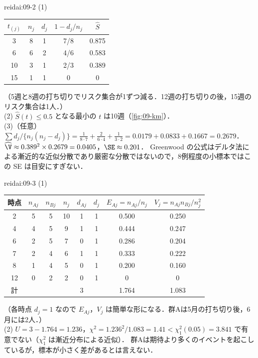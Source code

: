 \begin{kaitou}{reidai:09-2}
(1)
\begin{center}\small
\begin{tabular}{@{}ccccc@{}}
\toprule
$t_{(j)}$ & $n_j$ & $d_j$ & $1-d_j/n_j$ & $\hat S$\\
\midrule
3 & 8 & 1 & 7/8 & 0.875\\
6 & 6 & 2 & 4/6 & 0.583\\
10 & 3 & 1 & 2/3 & 0.389\\
15 & 1 & 1 & 0 & 0\\
\bottomrule
\end{tabular}
\end{center}
（5週と8週の打ち切りでリスク集合が1ずつ減る．12週の打ち切りの後，15週のリスク集合は1人．）\\
(2) $\hat S(t)\le0.5$ となる最小の $t$ は10週（\cref{fig:09-km}）．\\
(3)（任意）$\sum d_j/\{n_j(n_j-d_j)\}=\frac{1}{8\cdot7}+\frac{2}{6\cdot4}+\frac{1}{3\cdot2}=0.0179+0.0833+0.1667=0.2679$．
$\widehat\V\approx0.389^2\times0.2679=0.0405$，$\SE\approx0.201$．
Greenwood の公式はデルタ法による漸近的な近似分散であり厳密な分散ではないので，8例程度の小標本ではこの SE は目安にすぎない．
\end{kaitou}

\begin{kaitou}{reidai:09-3}
(1)
\begin{center}\small
\begin{tabular}{@{}cccccccc@{}}
\toprule
時点 & $n_{Aj}$ & $n_{Bj}$ & $n_j$ & $d_{Aj}$ & $d_j$ & $E_{Aj}=n_{Aj}/n_j$ & $V_j=n_{Aj}n_{Bj}/n_j^2$\\
\midrule
2 & 5 & 5 & 10 & 1 & 1 & 0.500 & 0.250\\
4 & 4 & 5 & 9 & 1 & 1 & 0.444 & 0.247\\
6 & 2 & 5 & 7 & 0 & 1 & 0.286 & 0.204\\
7 & 2 & 4 & 6 & 1 & 1 & 0.333 & 0.222\\
8 & 1 & 4 & 5 & 0 & 1 & 0.200 & 0.160\\
12 & 0 & 2 & 2 & 0 & 1 & 0 & 0\\
\midrule
計 & & & & 3 & & 1.764 & 1.083\\
\bottomrule
\end{tabular}
\end{center}
（各時点 $d_j=1$ なので $E_{Aj}$，$V_j$ は簡単な形になる．群Aは5月の打ち切り後，6月には2人．）\\
(2) $U=3-1.764=1.236$，$\chi^2=1.236^2/1.083=1.41<\chi^2_1(0.05)=3.841$ で有意でない（$\chi^2_1$ は漸近分布による近似）．
群Aは期待より多くのイベントを起こしているが，標本が小さく差があるとは言えない．
\end{kaitou}


